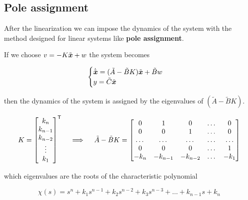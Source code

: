 \subsection{Pole assignment}

After the linearization we can impose the dynamics of the system with the method designed for linear systems like \textbf{pole assignment}.

If we choose $v = - K \tilde{\boldsymbol{x}} + w$ the system becomes

\[
    \begin{cases}
        \dot{\tilde{\boldsymbol{x}}} = (\tilde A - \tilde B K) \tilde{\boldsymbol{x}} + \tilde B w \\
        y = \tilde C \tilde{\boldsymbol{x}}
    \end{cases}
\]

then the dynamics of the system is assigned by the eigenvalues of $(\tilde A - \tilde B K)$.

\begin{gather*}
    K = \begin{bmatrix}
    k_n \\ k_{n-1} \\ k_{n-2} \\ \vdots \\ k_1
    \end{bmatrix}^{\mathsf{T}}
    \quad \implies \quad
    \tilde A - \tilde B K = \begin{bmatrix}
        0 & 1 & 0 & \dots & 0 \\
        0 & 0 & 1 & \dots & 0 \\
        \dots & \dots & \dots & \dots & \dots \\
        0 & 0 & 0 & \dots & 1 \\
        -k_n & -k_{n-1} & -k_{n-2} & \dots & -k_1 \\
    \end{bmatrix}
\end{gather*}

which eigenvalues are the roots of the characteristic polynomial

\[
    \chi(s) = s^n + k_1 s^{n-1} + k_2 s^{n-2} + k_3 s^{n-3} + \dots + k_{n-1} s + k_n
\]

